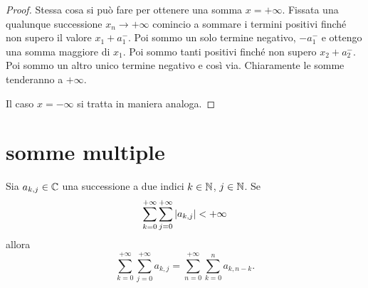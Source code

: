\begin{proof}
Stessa cosa si può fare per ottenere una somma $x=+\infty$. Fissata una qualunque
successione $x_n \to +\infty$ comincio a sommare i termini positivi finché non supero il valore $x_1+a_1^-$. 
Poi sommo un solo termine negativo, $-a_1^-$ e ottengo una somma maggiore di $x_1$. 
Poi sommo tanti positivi finché non supero $x_2+a_2^-$. 
Poi sommo un altro unico termine negativo e così via. 
Chiaramente le somme tenderanno a $+\infty$.

Il caso $x=-\infty$ si tratta in maniera analoga.
\end{proof}

\section{somme multiple}

\begin{theorem}
  \label{th:somma_Cauchy}%
Sia $a_{k,j}\in {\mathbb C}$ una successione a due indici $k\in {\mathbb N}$, $j\in{\mathbb N}$.
Se 
\[
  \sum_{k=0}^{+\infty} \sum_{j=0}^{+\infty} {\left|a_{k,j}\right|} < +\infty
\]  
allora 
\[
  \sum_{k=0}^{+\infty} \sum_{j=0}^{+\infty} a_{k,j}
   = \sum_{n=0}^{+\infty} \sum_{k=0}^{n} a_{k,n-k}.
\]
\end{theorem}
%
